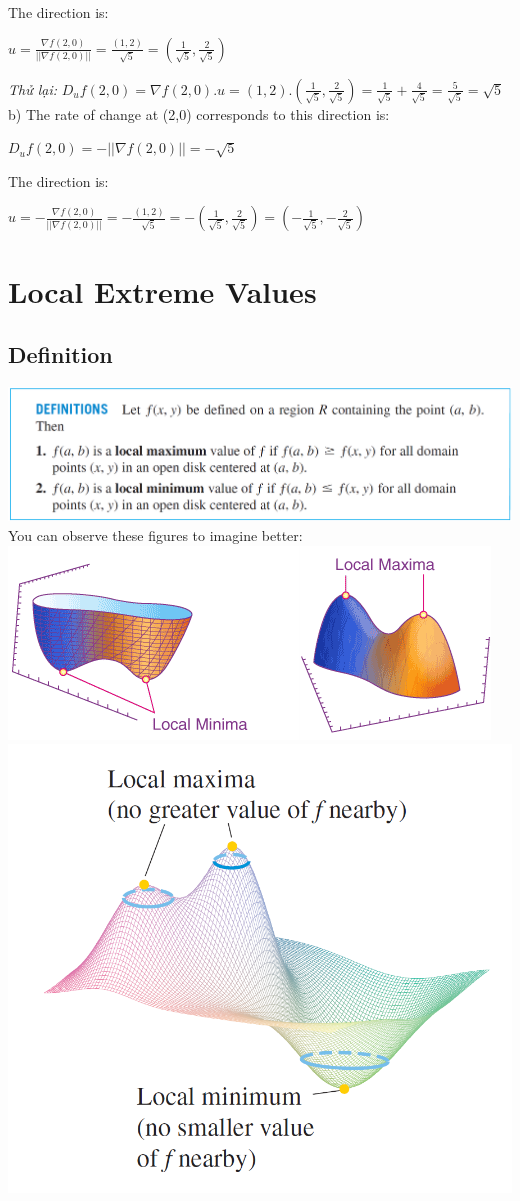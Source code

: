 \documentclass{article}
\begin{document}
The direction is:
\begin{center}
    $u=\displaystyle\frac{\nabla f(2,0)}{||\nabla f(2,0)||}=\frac{(1,2)}{\sqrt{5}}=\left(\frac{1}{\sqrt{5}},\frac{2}{\sqrt{5}}\right)$
\end{center}
\textit{Thử lại:} $D_uf(2,0)=\nabla f(2,0).u=(1,2).\displaystyle\left(\frac{1}{\sqrt{5}},\frac{2}{\sqrt{5}}\right)=\frac{1}{\sqrt{5}}+\frac{4}{\sqrt{5}}=\frac{5}{\sqrt{5}}=\sqrt{5}$\\
b) The rate of change at (2,0) corresponds to this direction is:
\begin{center}
    $D_uf(2,0)=-||\nabla f(2,0)||=-\sqrt{5}$
\end{center}
The direction is:
\begin{center}
    $u=\displaystyle-\frac{\nabla f(2,0)}{||\nabla f(2,0)||}=-\frac{(1,2)}{\sqrt{5}}=-\left(\frac{1}{\sqrt{5}},\frac{2}{\sqrt{5}}\right)=\left(-\frac{1}{\sqrt{5}},-\frac{2}{\sqrt{5}}\right)$
\end{center}
\section{Local Extreme Values}
\subsection{Definition}    
\includegraphics[width=1\linewidth]{2.2.png}\\
You can observe these figures to imagine better:\\
\includegraphics[width=0.6\linewidth]{3.222.png}
\includegraphics[width=0.4\linewidth]{3.22.png}\\
\end{document}
